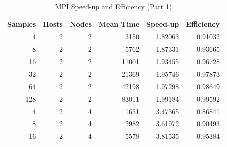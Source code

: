 \documentclass[journal,transmag]{IEEEtran}
\begin{document}
	\begin{table}[h]
	\centering
	\caption{MPI Speed-up and Efficiency (Part 1)}
	\label{table_mpi_data_1}
	\begin{tabular}{|r|r|r|r|r|r|}
		\hline
		\multicolumn{1}{|l|}{Samples} & \multicolumn{1}{l|}{Hosts} & \multicolumn{1}{l|}{Nodes} & \multicolumn{1}{l|}{Mean Time} & \multicolumn{1}{l|}{Speed-up} & \multicolumn{1}{l|}{Efficiency} \\ \hline
		4                             & 2                          & 2                                & 3150                           & 1.82063                       & 0.91032                         \\ \hline
		8                             & 2                          & 2                                & 5762                           & 1.87331                       & 0.93665                         \\ \hline
		16                            & 2                          & 2                                & 11001                          & 1.93455                       & 0.96728                         \\ \hline
		32                            & 2                          & 2                                & 21369                          & 1.95746                       & 0.97873                         \\ \hline
		64                            & 2                          & 2                                & 42198                          & 1.97298                       & 0.98649                         \\ \hline
		128                           & 2                          & 2                                & 83011                          & 1.99184                       & 0.99592                         \\ \hline
		4                             & 2                          & 4                                & 1651                           & 3.47365                       & 0.86841                         \\ \hline
		8                             & 2                          & 4                                & 2982                           & 3.61972                       & 0.90493                         \\ \hline
		16                            & 2                          & 4                                & 5578                           & 3.81535                       & 0.95384                         \\ \hline

\end{tabular}
\end{table}
\end{document}
